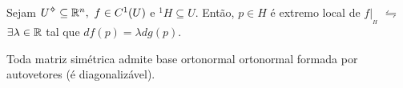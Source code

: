 \Ef

\hypertarget{thmML}{}
\begin{theorem}
    Sejam \(U\ab \subseteq \R^n, \ f \in C^1(U)\) e \(^1 H\subseteq U\). Então, \(p\in H\) é extremo local de \(f|_{_H}\) \(\leftrightharpoons\) \(\exists \lambda \in \mathbb{R}\) tal que \(df(p) =\lambda dg(p)\).   
\end{theorem} 


\begin{theorem}
    Toda matriz simétrica admite base ortonormal ortonormal formada por autovetores (é diagonalizável). %
\end{theorem}
